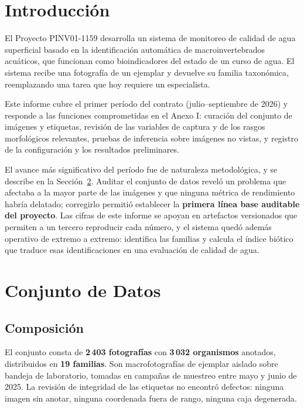 \documentclass[onecolumn]{article}
\begin{document}
\section{Introducción}

El Proyecto PINV01-1159 desarrolla un sistema de monitoreo de calidad de agua superficial basado en la identificación automática de macroinvertebrados acuáticos, que funcionan como bioindicadores del estado de un curso de agua. El sistema recibe una fotografía de un ejemplar y devuelve su familia taxonómica, reemplazando una tarea que hoy requiere un especialista.

Este informe cubre el primer período del contrato (julio--septiembre de 2026) y responde a las funciones comprometidas en el Anexo I: curación del conjunto de imágenes y etiquetas, revisión de las variables de captura y de los rasgos morfológicos relevantes, pruebas de inferencia sobre imágenes no vistas, y registro de la configuración y los resultados preliminares.

El avance más significativo del período fue de naturaleza metodológica, y se describe en la Sección~\ref{sec:datos}. Auditar el conjunto de datos reveló un problema que afectaba a la mayor parte de las imágenes y que ninguna métrica de rendimiento habría delatado; corregirlo permitió establecer la \textbf{primera línea base auditable del proyecto}. Las cifras de este informe se apoyan en artefactos versionados que permiten a un tercero reproducir cada número, y el sistema quedó además operativo de extremo a extremo: identifica las familias y calcula el índice biótico que traduce esas identificaciones en una evaluación de calidad de agua.

\section{Conjunto de Datos}
\label{sec:datos}

\subsection{Composición}

El conjunto consta de \textbf{2\,403 fotografías} con \textbf{3\,032 organismos} anotados, distribuidos en \textbf{19 familias}. Son macrofotografías de ejemplar aislado sobre bandeja de laboratorio, tomadas en campañas de muestreo entre mayo y junio de 2025. La revisión de integridad de las etiquetas no encontró defectos: ninguna imagen sin anotar, ninguna coordenada fuera de rango, ninguna caja degenerada.
\end{document}
